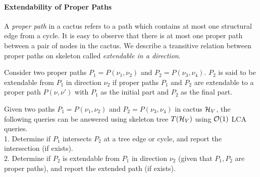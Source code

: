 \paragraph{Extendability of Proper Paths}
A \textit{proper path} in a cactus refers to a path which contains at most one structural edge from a cycle. It is easy to observe that there is at most one proper path between a pair of nodes in the cactus. We describe a transitive relation between proper paths on skeleton called \textit{extendable in a direction}.


\begin{definition}
\label{def:extendable-in-a-direction}
Consider two proper paths $P_1 = P(\nu_1,\nu_2)$ and $P_2 = P(\nu_3,\nu_4)$. $P_2$ is said to be extendable from $P_1$ in direction $\nu_2$ if proper paths $P_1$ and $P_2$ are extendable to a proper path $P(\nu,\nu')$ with $P_1$ as the initial part and $P_2$ as the final part.
\label{def:extendable}
\end{definition}


\begin{lemma}
\label{lem:skeleton-tree-queries}
Given two paths $P_1 = P(\nu_1,\nu_2)$ and $P_2 = P(\nu_3,\nu_4)$ in cactus ${\cal H}_V$, the following queries can be answered using skeleton tree ${T}({\cal H}_V)$ using ${\cal O}(1)$ LCA queries.\\
1. Determine if $P_1$ intersects $P_2$ at a tree edge or cycle, and report the intersection (if exists).\\
2. Determine if $P_2$ is extendable from $P_1$ in direction $\nu_2$ (given that $P_1,P_2$ are proper paths), and report the extended path (if exists).
\end{lemma}


